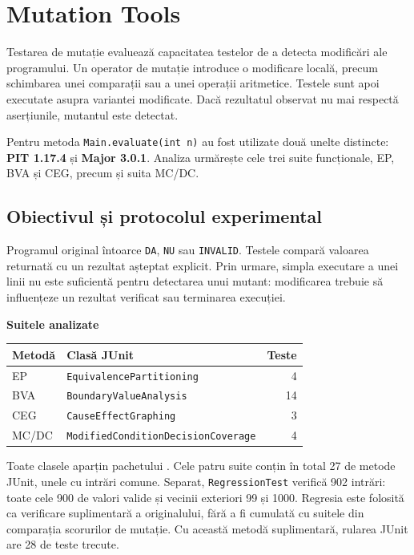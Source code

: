 \documentclass[11pt,a4paper]{article}
\begin{document}
\clearpage
\section{Mutation Tools}
\label{sec:mutation-tools}
Testarea de mutație evaluează capacitatea testelor de a detecta modificări
ale programului. Un operator de mutație introduce o modificare locală,
precum schimbarea unei comparații sau a unei operații aritmetice.
Testele sunt apoi executate asupra variantei modificate. Dacă rezultatul
observat nu mai respectă aserțiunile, mutantul este detectat.

Pentru metoda \texttt{Main.evaluate(int n)} au fost utilizate două unelte
distincte: \textbf{PIT 1.17.4} și \textbf{Major 3.0.1}.
Analiza urmărește cele trei suite funcționale, EP, BVA și CEG,
precum și suita MC/DC. 

\subsection{Obiectivul și protocolul experimental}
Programul original întoarce \texttt{DA}, \texttt{NU} sau \texttt{INVALID}.
Testele compară valoarea returnată cu un rezultat așteptat explicit.
Prin urmare, simpla executare a unei linii nu este suficientă pentru
detectarea unui mutant: modificarea trebuie să influențeze un rezultat
verificat sau terminarea execuției.

\textbf{Suitele analizate}
\begin{center}
\begingroup\small
\begin{tabular}{@{}llr@{}}
\toprule
Metodă & Clasă JUnit & Teste \\
\midrule
EP & \texttt{EquivalencePartitioning} & 4 \\
BVA & \texttt{BoundaryValueAnalysis} & 14 \\
CEG & \texttt{CauseEffectGraphing} & 3 \\
MC/DC & \texttt{ModifiedConditionDecisionCoverage} & 4 \\
\bottomrule
\end{tabular}
\endgroup
\end{center}
Toate clasele aparțin pachetului .
Cele patru suite conțin în total 27 de metode JUnit, unele cu intrări comune.
Separat, \texttt{RegressionTest} verifică 902 intrări: toate cele 900 de valori
valide și vecinii exteriori 99 și 1000. Regresia este folosită ca verificare
suplimentară a originalului, fără a fi cumulată cu suitele din comparația
scorurilor de mutație. Cu această metodă suplimentară, rularea JUnit are
28 de teste trecute.
\end{document}
